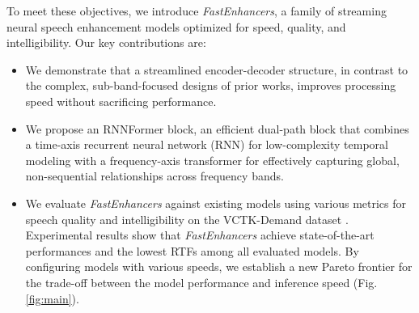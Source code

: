 To meet these objectives, we introduce \textit{FastEnhancers}, a family of streaming neural speech enhancement models optimized for speed, quality, and intelligibility. Our key contributions are:
\begin{itemize}[itemsep=0pt,leftmargin=1em]
    \item We demonstrate that a streamlined encoder-decoder structure, in contrast to the complex, sub-band-focused designs of prior works, improves processing speed without sacrificing performance.
    \item We propose an RNNFormer block, an efficient dual-path block that combines a time-axis recurrent neural network (RNN) for low-complexity temporal modeling with a frequency-axis transformer for effectively capturing global, non-sequential relationships across frequency bands.
    \item We evaluate \textit{FastEnhancers} against existing models using various metrics for speech quality and intelligibility on the VCTK-Demand dataset \cite{vctk-demand}. Experimental results show that \textit{FastEnhancers} achieve state-of-the-art performances and the lowest RTFs among all evaluated models. By configuring models with various speeds, we establish a new Pareto frontier for the trade-off between the model performance and inference speed (Fig. \ref{fig:main}).
\end{itemize}

